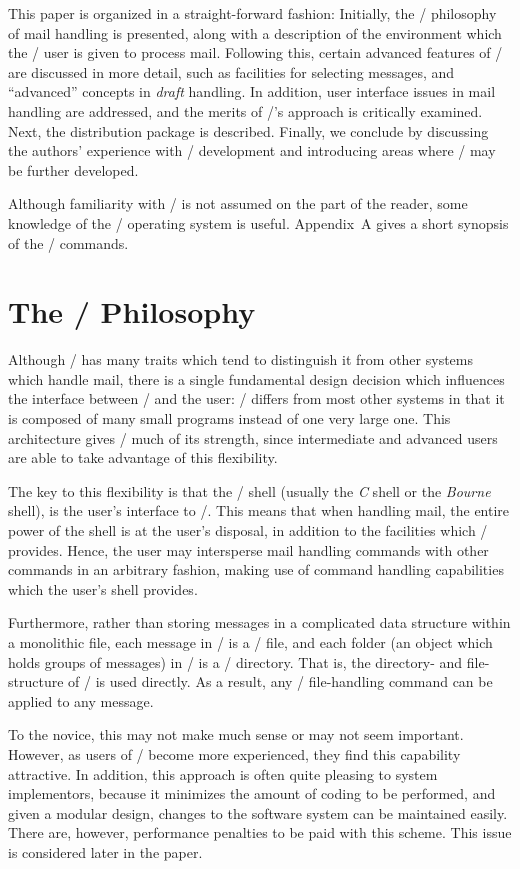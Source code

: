 This paper is organized in a straight-forward fashion:
Initially,
the \MH/ philosophy of mail handling is presented,
along with a description of the environment which the \MH/ user is given to
process mail.
Following this,
certain advanced features of \MH/ are discussed in more detail,
such as facilities for selecting messages,
and ``advanced'' concepts in {\it draft} handling.
In addition,
user interface issues in mail handling are addressed,
and the merits of \MH/'s approach is critically examined.
Next,
the  distribution package is described.
Finally,
we conclude by discussing the authors' experience with \MH/ development
and introducing areas where \MH/ may be further developed.

Although familiarity with \MH/ is not assumed on the part of the reader,
some knowledge of the \unix/ operating system is useful.
Appendix~A gives a short synopsis of the \MH/ commands.

\section{The \MH/ Philosophy}			%
Although \MH/ has many traits which tend to distinguish it from other systems
which handle mail,
there is a single fundamental design decision which influences the interface
between \MH/ and the user:
\MH/ differs from most other systems in that it is composed of many small
programs instead of one very large one.
This architecture gives \MH/ much of its strength,
since intermediate and advanced users are able to take advantage of this
flexibility.

The key to this flexibility is that the \unix/ shell
(usually the {\it C} shell or the {\it Bourne} shell),
is the user's interface to \MH/.
This means that when handling mail,
the entire power of the shell is at the user's disposal,
in addition to the
facilities which \MH/ provides.
Hence,
the user may intersperse mail handling commands with other commands in an
arbitrary fashion,
making use of command handling capabilities which
the user's shell provides.

Furthermore,
rather than storing messages in a complicated data structure
within a monolithic file,
each message in \MH/ is a \unix/ file,
and each folder (an object which holds groups of messages)
in \MH/  is a \unix/ directory.
That is,
the directory- and file-structure of \unix/ is used directly.
As a result,
any \unix/ file-handling command can be applied to any message.

To the novice,
this may not make much sense or may not seem important.
However,
as users of \MH/ become more experienced,
they find this capability attractive.
In addition,
this approach is often quite pleasing to system implementors,
because it minimizes the amount of coding to be performed,
and given a modular design,
changes to the software system can be maintained easily.
There are, however, performance penalties to be paid with this scheme.
This issue is considered later in the paper.

